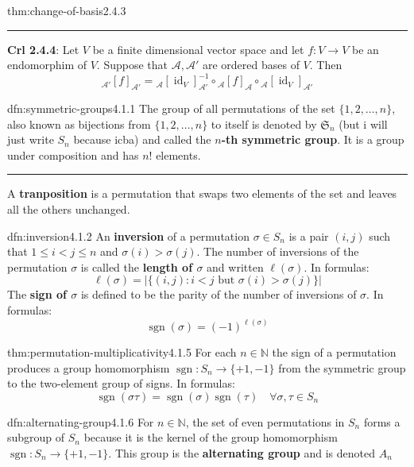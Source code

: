\documentclass[landscape, 8pt]{extarticle}
\DeclareMathOperator{\sgn}{sgn}
\DeclareMathOperator{\id}{id}
\begin{document}
\begin{multicols}{3}
\begin{thm}{thm:change-of-basis}{2.4.3}
    \noindent\rule{\textwidth}{0.2pt}
    \textbf{Crl 2.4.4}: Let $V$ be a finite dimensional vector space and let $f : V \to V$ be an endomorphim of $V$. Suppose that $\mathcal{A}, \mathcal{A}'$ are ordered bases of $V$. Then
    \[{}_{\mathcal{A}'}[f]_{\mathcal{A}'} = {}_{\mathcal{A}}[\id_{V}]_{\mathcal{A}'}^{-1} \circ {}_{\mathcal{A}}[f]_{\mathcal{A}} \circ {}_{\mathcal{A}}[\id_{V}]_{\mathcal{A}'}\]
\end{thm}


\begin{dfn}{dfn:symmetric-groups}{4.1.1}
    The group of all permutations of the set $\{1,2,\dots,n\}$, also known as bijections from $\{1,2,\dots,n\}$ to itself is denoted by $\mathfrak{S}_{n}$ (but i will just write $S_{n}$ because icba) and called the \textbf{$n$-th symmetric group}. It is a group under composition and has $n!$ elements.

    \noindent\rule{\textwidth}{0.2pt}
    A \textbf{tranposition} is a permutation that swaps two elements of the set and leaves all the others unchanged.
\end{dfn}

\begin{dfn}{dfn:inversion}{4.1.2}
    An \textbf{inversion} of a permutation $\sigma\in S_{n}$ is a pair $(i, j)$ such that $1 \le i < j \le n$ and $\sigma(i) > \sigma(j)$. The number of inversions of the permutation $\sigma$ is called the \textbf{length of $\sigma$} and written $\ell(\sigma)$. In formulas:
    \[\ell(\sigma) = \lvert \{(i,j) : i < j \text{ but } \sigma(i) > \sigma(j)\} \rvert\]
    The \textbf{sign of $\sigma$} is defined to be the parity of the number of inversions of $\sigma$. In formulas:
    \[\sgn(\sigma) = (-1)^{\ell(\sigma)}\]
\end{dfn}

\begin{thm}{thm:permutation-multiplicativity}{4.1.5}
    For each $n\in \mathbb{N}$ the sign of a permutation produces a group homomorphism $\sgn : S_{n} \to \{+1, -1\}$ from the symmetric group to the two-element group of signs. In formulas:
    \[\sgn(\sigma\tau) = \sgn(\sigma)\sgn(\tau) \quad \forall \sigma, \tau\in S_{n}\]
\end{thm}

\begin{dfn}{dfn:alternating-group}{4.1.6}
    For $n\in \mathbb{N}$, the set of even permutations in $S_{n}$ forms a subgroup of $S_{n}$ because it is the kernel of the group homomorphism $\sgn : S_{n}\to \{+1, -1\}$. This group is the \textbf{alternating group} and is denoted $A_{n}$
\end{dfn}


\end{multicols}
\end{document}
